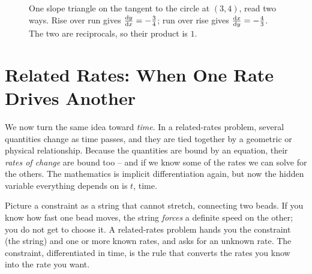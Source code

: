 \begin{figure}[htbp]
\centering
{}
\caption{One slope triangle on the tangent to the circle at $(3,4)$, read two ways. Rise over run
gives $\frac{\mathrm{d} y}{\mathrm{d} x}=-\tfrac34$; run over rise gives $\frac{\mathrm{d} x}{\mathrm{d} y}=-\tfrac43$. The two are reciprocals, so
their product is $1$.}
\label{ch13:fig-rise-run}
\end{figure}

\section{Related Rates: When One Rate Drives Another}
\label{ch13:related-rates}

We now turn the same idea toward \emph{time}. In a related-rates problem, several quantities change
as time passes, and they are tied together by a geometric or physical relationship. Because the
quantities are bound by an equation, their \emph{rates of change} are bound too -- and if we know
some of the rates we can solve for the others. The mathematics is implicit differentiation again,
but now the hidden variable everything depends on is $t$, time.

\begin{intuitionbox}
Picture a constraint as a string that cannot stretch, connecting two beads. If you know how fast
one bead moves, the string \emph{forces} a definite speed on the other; you do not get to choose it.
A related-rates problem hands you the constraint (the string) and one or more known rates, and asks
for an unknown rate. The constraint, differentiated in time, is the rule that converts the rates you
know into the rate you want.
\end{intuitionbox}

